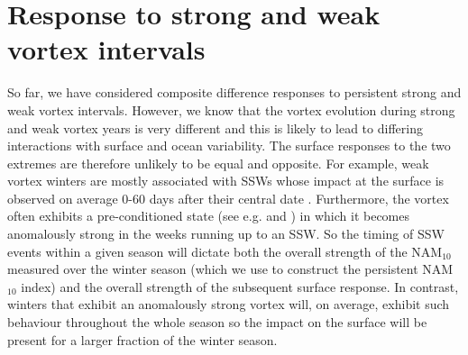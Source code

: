 \section{Response to strong and weak vortex intervals}
So far, we have considered composite difference responses to persistent strong and weak  vortex intervals. However, we know that the vortex evolution during strong and weak vortex years is very different and this is likely to lead to differing interactions with surface and ocean variability. The surface responses to the two extremes are therefore unlikely to be equal and opposite. For example, weak vortex winters are mostly associated with SSWs whose impact at the surface is observed on average 0-60 days after their central date \citep{baldwinStratospheric2001a}. Furthermore,  the vortex often exhibits a pre-conditioned state (see e.g. \cite{charltonNew2007c} and \cite{bancalaPreconditioning2012b}) in which it becomes anomalously strong in the weeks running up to an SSW. So the timing of SSW events within a given season will dictate both the overall strength of the NAM$_{10}$ measured over the winter season (which we use to construct the persistent NAM$_{10}$ index) and the overall strength of the subsequent surface response. In contrast, winters that exhibit an anomalously strong vortex will, on average, exhibit such behaviour throughout the whole season so the impact on the surface will be present for a larger fraction of the winter season.

